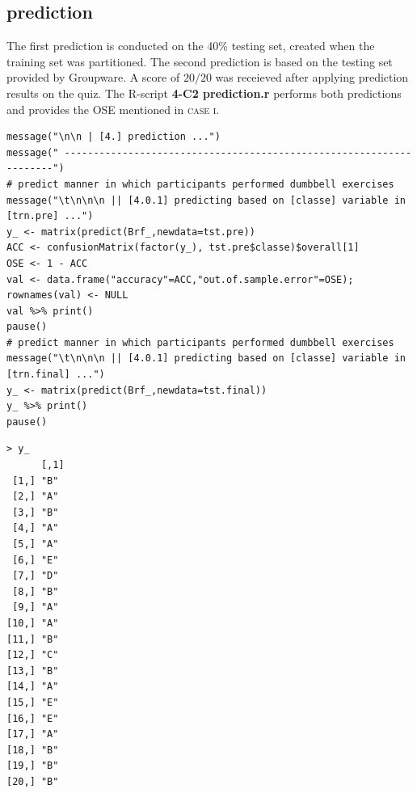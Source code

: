 \documentclass[10pt, twoside]{article}
\begin{document}
\begin{center}
\subsection{prediction}
\vspace{-3ex}
\end{center}

\noindent
The first prediction is conducted on the 40\% testing set, created when the training set
was partitioned. The second prediction is based on the testing set provided by Groupware.
A score of $20/20$ was receieved after applying prediction results on the quiz. The R-script
\textbf{4-C2 prediction.r} performs both predictions and provides the OSE mentioned in \textsc{case i}.
\bigskip

\begin{verbatim}
message("\n\n | [4.] prediction ...")
message(" --------------------------------------------------------------------")
# predict manner in which participants performed dumbbell exercises
message("\t\n\n\n || [4.0.1] predicting based on [classe] variable in [trn.pre] ...")
y_ <- matrix(predict(Brf_,newdata=tst.pre))
ACC <- confusionMatrix(factor(y_), tst.pre$classe)$overall[1]
OSE <- 1 - ACC
val <- data.frame("accuracy"=ACC,"out.of.sample.error"=OSE); rownames(val) <- NULL
val %>% print()
pause()
# predict manner in which participants performed dumbbell exercises
message("\t\n\n\n || [4.0.1] predicting based on [classe] variable in [trn.final] ...")
y_ <- matrix(predict(Brf_,newdata=tst.final))
y_ %>% print()
pause()
\end{verbatim}

\begin{verbatim}
> y_
      [,1]
 [1,] "B"
 [2,] "A"
 [3,] "B"
 [4,] "A"
 [5,] "A"
 [6,] "E"
 [7,] "D"
 [8,] "B"
 [9,] "A"
[10,] "A"
[11,] "B"
[12,] "C"
[13,] "B"
[14,] "A"
[15,] "E"
[16,] "E"
[17,] "A"
[18,] "B"
[19,] "B"
[20,] "B"
\end{verbatim}
\end{document}
